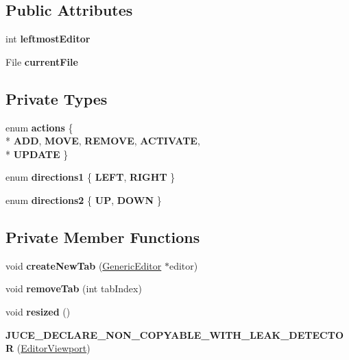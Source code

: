 \subsection*{Public Attributes}
\begin{DoxyCompactItemize}
\item 
\hypertarget{classEditorViewport_ab05cd676ab48b8e252d56d1fb9f07d4f}{int {\bfseries leftmost\-Editor}}\label{classEditorViewport_ab05cd676ab48b8e252d56d1fb9f07d4f}

\item 
\hypertarget{classEditorViewport_a09ffd88dead53e37ce7701adeda3ce8a}{File {\bfseries current\-File}}\label{classEditorViewport_a09ffd88dead53e37ce7701adeda3ce8a}

\end{DoxyCompactItemize}
\subsection*{Private Types}
\begin{DoxyCompactItemize}
\item 
enum {\bfseries actions} \{ \\*
{\bfseries A\-D\-D}, 
{\bfseries M\-O\-V\-E}, 
{\bfseries R\-E\-M\-O\-V\-E}, 
{\bfseries A\-C\-T\-I\-V\-A\-T\-E}, 
\\*
{\bfseries U\-P\-D\-A\-T\-E}
 \}
\item 
enum {\bfseries directions1} \{ {\bfseries L\-E\-F\-T}, 
{\bfseries R\-I\-G\-H\-T}
 \}
\item 
enum {\bfseries directions2} \{ {\bfseries U\-P}, 
{\bfseries D\-O\-W\-N}
 \}
\end{DoxyCompactItemize}
\subsection*{Private Member Functions}
\begin{DoxyCompactItemize}
\item 
\hypertarget{classEditorViewport_a93de817036f82c0a1253f81343e34347}{void {\bfseries create\-New\-Tab} (\hyperlink{classGenericEditor}{Generic\-Editor} $\ast$editor)}\label{classEditorViewport_a93de817036f82c0a1253f81343e34347}

\item 
\hypertarget{classEditorViewport_ad78263f172f5ee69109bcdb728e22aeb}{void {\bfseries remove\-Tab} (int tab\-Index)}\label{classEditorViewport_ad78263f172f5ee69109bcdb728e22aeb}

\item 
\hypertarget{classEditorViewport_a1c0ecac694cc8340d464391778b5f727}{void {\bfseries resized} ()}\label{classEditorViewport_a1c0ecac694cc8340d464391778b5f727}

\item 
\hypertarget{classEditorViewport_a3216cc1566e1b5e891b1825436abb9dc}{{\bfseries J\-U\-C\-E\-\_\-\-D\-E\-C\-L\-A\-R\-E\-\_\-\-N\-O\-N\-\_\-\-C\-O\-P\-Y\-A\-B\-L\-E\-\_\-\-W\-I\-T\-H\-\_\-\-L\-E\-A\-K\-\_\-\-D\-E\-T\-E\-C\-T\-O\-R} (\hyperlink{classEditorViewport}{Editor\-Viewport})}\label{classEditorViewport_a3216cc1566e1b5e891b1825436abb9dc}

\end{DoxyCompactItemize}
